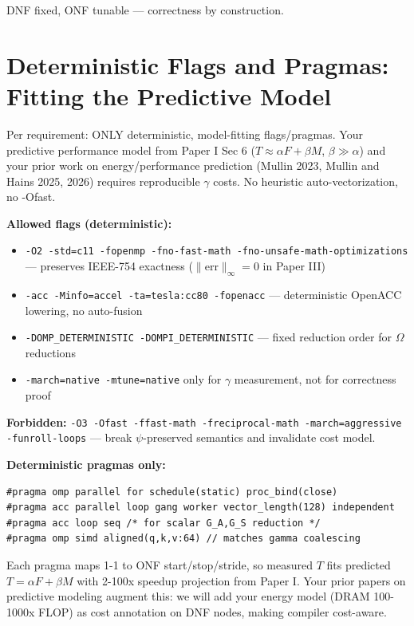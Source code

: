 \documentclass[11pt,a4paper]{article}
\begin{document}
DNF fixed, ONF tunable — correctness by construction.


\section{Deterministic Flags and Pragmas: Fitting the Predictive Model}

Per requirement: ONLY deterministic, model-fitting flags/pragmas. Your predictive performance model from Paper I Sec 6 ($T \approx \alpha F + \beta M$, $\beta\gg\alpha$) and your prior work on energy/performance prediction (Mullin 2023, Mullin and Hains 2025, 2026) requires reproducible $\gamma$ costs. No heuristic auto-vectorization, no -Ofast.

\textbf{Allowed flags (deterministic):}
\begin{itemize}
\item \texttt{-O2 -std=c11 -fopenmp -fno-fast-math -fno-unsafe-math-optimizations} — preserves IEEE-754 exactness ($\|\text{err}\|_\infty=0$ in Paper III)
\item \texttt{-acc -Minfo=accel -ta=tesla:cc80 -fopenacc} — deterministic OpenACC lowering, no auto-fusion
\item \texttt{-DOMP\_DETERMINISTIC -DOMPI\_DETERMINISTIC} — fixed reduction order for $\Omega$ reductions
\item \texttt{-march=native -mtune=native} only for $\gamma$ measurement, not for correctness proof
\end{itemize}

\textbf{Forbidden:} \texttt{-O3 -Ofast -ffast-math -freciprocal-math -march=aggressive -funroll-loops} — break $\psi$-preserved semantics and invalidate cost model.

\textbf{Deterministic pragmas only:}
\begin{lstlisting}[basicstyle=\ttfamily\small]
#pragma omp parallel for schedule(static) proc_bind(close)
#pragma acc parallel loop gang worker vector_length(128) independent
#pragma acc loop seq /* for scalar G_A,G_S reduction */
#pragma omp simd aligned(q,k,v:64) // matches gamma coalescing
\end{lstlisting}

Each pragma maps 1-1 to ONF start/stop/stride, so measured $T$ fits predicted $T = \alpha F + \beta M$ with 2-100x speedup projection from Paper I. Your prior papers on predictive modeling augment this: we will add your energy model (DRAM 100-1000x FLOP) as cost annotation on DNF nodes, making compiler cost-aware.
\end{document}
